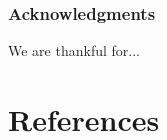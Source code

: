 \documentclass{article}
\begin{document}
%
%

\subsubsection*{Acknowledgments}

We are thankful for...

\section*{References}
\small




%
%
\end{document}
